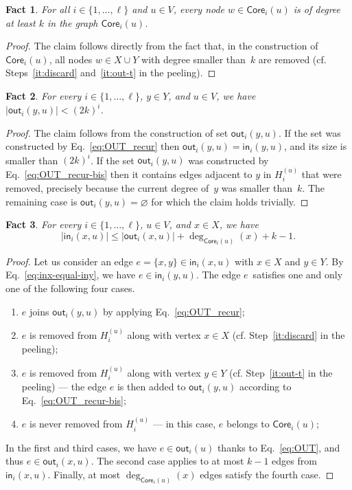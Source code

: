 \documentclass{article}
\newcommand{\F}{{\mathsf{out}}}
\renewcommand{\H}{{\mathsf{in}}}
\newcommand{\bp}{X}
\newcommand{\tp}{Y}
\newtheorem{fact}{Fact}
\begin{document}
\begin{fact}\label{fact:deg_ker}
    For all $i\in\{1,\dots,\ell\}$ and $u\in V$, every node $w\in\mathsf{Core}_i(u)$ is of degree at least $k$ in the graph $\mathsf{Core}_i(u)$. 
\end{fact}

\begin{proof}
    The claim follows directly from the fact that, in the construction of  $\mathsf{Core}_i(u)$, all nodes $w\in \bp\cup\tp$ with degree smaller than~$k$ are removed (cf. Steps~\ref{it:discard} and~\ref{it:out-t} in the peeling).
\end{proof}

\begin{fact}\label{fact:OUT_size}
    For every $i\in\{1,\dots,\ell\}$, $y\in \tp$, and $u\in V$, we have $|\F_i(y,u)|< (2k)^i$.
\end{fact}

\begin{proof}
    The claim follows from the construction of set $\F_i(y,u)$. If the set was constructed by Eq.~\eqref{eq:OUT_recur} then $\F_i(y,u)=\H_i(y,u)$, and its size is smaller than $(2k)^i$. If the set $\F_i(y,u)$ was constructed by Eq.~\eqref{eq:OUT_recur-bis} then it contains edges adjacent to $y$ in $H_i^{(u)}$ that were removed, precisely because the current degree of~$y$ was smaller than~$k$. The remaining case is $\F_i(y,u)=\varnothing$ for which the claim holds trivially.  
\end{proof}

\begin{fact}\label{fact:size_IN}
    For every $i\in\{1,\dots,\ell\}$, $u\in V$, and  $x\in \bp$, we have \[|\H_i(x,u)|\leq|\F_i(x,u)|+\deg_{\mathsf{Core}_i(u)}(x)+k-1.\]    
\end{fact}

\begin{proof}
Let us consider an edge $e=\{x,y\}\in \H_i(x,u)$ with $x\in \bp$ and $y\in \tp$. By Eq.~\eqref{eq:inx-equal-iny}, we have $e\in \H_i(y,u)$. The edge $e$~satisfies one and only one of the following four cases. 
    \begin{enumerate}
        \item $e$ joins $\F_i(y,u)$ by applying Eq.~\eqref{eq:OUT_recur};    
        \item $e$ is removed from $H_i^{(u)}$ along with vertex $x\in \bp$ (cf. Step~\ref{it:discard} in the peeling); 
        \item $e$ is removed from $H_i^{(u)}$ along with vertex $y\in \tp$ (cf. Step~\ref{it:out-t} in the peeling) --- the edge $e$ is then added to $\F_i(y,u)$ according to Eq.~\eqref{eq:OUT_recur-bis};
        \item $e$ is never removed from $H_i^{(u)}$ --- in this case, $e$ belongs to $\mathsf{Core}_i(u)$; \end{enumerate}
     In the first and third cases, we have $e\in \F_i(u)$ thanks to Eq.~\eqref{eq:OUT}, and thus $e\in \F_i(x,u)$. The second case applies to at most $k-1$ edges from $\H_i(x,u)$. Finally, at most $\deg_{\mathsf{Core}_i(u)}(x)$ edges satisfy the fourth case.
\end{proof}
\end{document}
